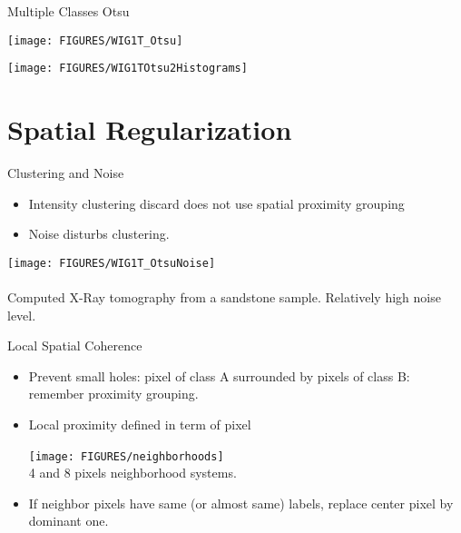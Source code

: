\documentclass[9pt]{beamer}
\newcommand{\myemph}[1]{{\color{blue}{#1}}}
\begin{document}
\begin{frame}[t]{Multiple Classes Otsu}
  \begin{center}
    \texttt{[image: FIGURES/WIG1T\_Otsu]}
  \end{center}
  \begin{center}
    \texttt{[image: FIGURES/WIG1TOtsu2Histograms]}
  \end{center}
\end{frame}





\section{Spatial Regularization}


\begin{frame}[t]{Clustering and Noise}
  \begin{itemize}
  \item Intensity clustering discard does not use spatial proximity grouping
  \item Noise disturbs clustering.
  \end{itemize}
  \begin{center}
    \texttt{[image: FIGURES/WIG1T\_OtsuNoise]}\\
    ~\\
    Computed X-Ray tomography from a sandstone sample. Relatively high noise level.
  \end{center}
\end{frame}


\begin{frame}[t]{Local Spatial Coherence}
  \begin{itemize}
  \item Prevent small holes: pixel of class A surrounded by pixels of class B: remember proximity grouping.\vfill
  \item Local proximity defined in term of pixel \myemph{neighborhoods}\vfill
    \begin{center}
      \texttt{[image: FIGURES/neighborhoods]}~\\
      4 and 8 pixels neighborhood systems.
    \end{center}\vfill
  \item If neighbor pixels have same (or almost same) labels, replace center pixel by dominant one.
  \end{itemize}
\end{frame}
\end{document}

